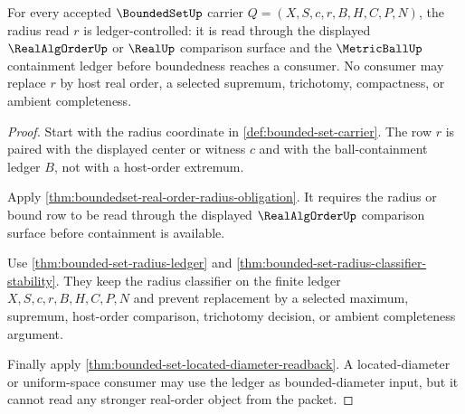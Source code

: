 \begin{theorem}
\label{thm:bounded-set-real-radius-ledger}
For every accepted $\BoundedSetUp$ carrier $Q=(X,S,c,r,B,H,C,P,N)$, the radius read $r$ is ledger-controlled: it is read through the displayed $\RealAlgOrderUp$ or $\RealUp$ comparison surface and the $\MetricBallUp$ containment ledger before boundedness reaches a consumer. No consumer may replace $r$ by host real order, a selected supremum, trichotomy, compactness, or ambient completeness.
\end{theorem}
\begin{proof}
Start with the radius coordinate in \autoref{def:bounded-set-carrier}. The row $r$ is paired with the displayed center or witness $c$ and with the ball-containment ledger $B$, not with a host-order extremum.

Apply \autoref{thm:boundedset-real-order-radius-obligation}. It requires the radius or bound row to be read through the displayed $\RealAlgOrderUp$ comparison surface before containment is available.

Use \autoref{thm:bounded-set-radius-ledger} and \autoref{thm:bounded-set-radius-classifier-stability}. They keep the radius classifier on the finite ledger $X,S,c,r,B,H,C,P,N$ and prevent replacement by a selected maximum, supremum, host-order comparison, trichotomy decision, or ambient completeness argument.

Finally apply \autoref{thm:bounded-set-located-diameter-readback}. A located-diameter or uniform-space consumer may use the ledger as bounded-diameter input, but it cannot read any stronger real-order object from the packet.
\end{proof}

